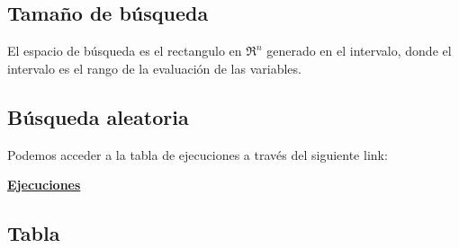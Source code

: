 \documentclass{article}
\begin{document}
\subsection*{Tamaño de búsqueda}

El espacio de búsqueda es el rectangulo en $\mathfrak{R}^n$ generado en el intervalo, donde el intervalo es el rango de la evaluación de las variables.

\newpage
\subsection*{Búsqueda aleatoria}
Podemos acceder a la tabla de ejecuciones a través del siguiente link: 

\href{./evaluationTracking.txt}{\textbf{Ejecuciones}}


\subsection*{Tabla}
\end{document}
